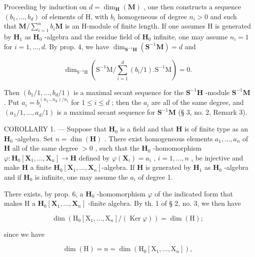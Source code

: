 Proceeding by induction on \(d = \dim_{\mathbf{H}}(\mathbf{M})\) , one then constructs a sequence \((b_1, \ldots, b_d)\) of elements of H, with \(b_i\) homogeneous of degree \(n_i > 0\) and such that \(\mathbf{M} / \sum_{i=1}^{n} b_i \mathbf{M}\) is an H-module of finite length. If one assumes H is generated by \(\mathbf{H}_1\) as \(\mathbf{H}_0\) -algebra and the residue field of \(\mathbf{H}_0\) infinite, one may assume \(n_i = 1\) for \(i = 1, \ldots, d\). By prop. 4, we have \(\dim_{\mathbf{S}^{-1}\mathbf{H}}(\mathbf{S}^{-1}\mathbf{M}) = d\) and

\[
\dim_ {\mathrm{S} ^ {- 1} \mathrm{H}} (\mathrm{S} ^ {- 1} \mathrm{M} / \sum_ {i = 1} ^ {d} (b _ {i} / 1). \mathrm{S} ^ {- 1} \mathrm{M}) = 0.
\]

Then \((b_{1} / 1,\dots,b_{d} / 1)\) is a maximal secant sequence for the \(\mathbf{S}^{-1}\mathbf{H}\) -module \(\mathbf{S}^{-1}\mathbf{M}\) . Put \(a_{i} = b_{i}^{(n_{1}\dots n_{d}) / n_{i}}\) for \(1\leqslant i\leqslant d\) ; then the \(a_{i}\) are all of the same degree, and \((a_{1} / 1,\dots,a_{d} / 1)\) is a maximal secant sequence for \(\mathbf{S}^{-1}\mathbf{M}\) (§ 3, no. 2, Remark 3).

COROLLARY 1. --- Suppose that \(\mathbf{H}_0\) is a field and that \(\mathbf{H}\) is of finite type as an \(\mathbf{H}_0\) -algebra. Set \(n = \dim(\mathbf{H})\) . There exist homogeneous elements \(a_1, ..., a_n\) of \(\mathbf{H}\) all of the same degree \(>0\) , such that the \(\mathbf{H}_0\) -homomorphism \(\varphi: \mathbf{H}_0[\mathbf{X}_1, ..., \mathbf{X}_n] \to \mathbf{H}\) defined by \(\varphi(\mathbf{X}_i) = a_i\) , \(i = 1, ..., n\) , be injective and make \(\mathbf{H}\) a finite \(\mathbf{H}_0[\mathbf{X}_1, ..., \mathbf{X}_n]\)-algebra. If \(\mathbf{H}\) is generated by \(\mathbf{H}_1\) as \(\mathbf{H}_0\) -algebra and if \(\mathbf{H}_0\) is infinite, one may assume the \(a_i\) of degree 1.

There exists, by prop. 6, a \(\mathbf{H}_0\) -homomorphism \(\varphi\) of the indicated form that makes H a \(\mathbf{H}_0[\mathbf{X}_1, \ldots, \mathbf{X}_n]\) -finite algebra. By th. 1 of § 2, no. 3, we then have

\[
\dim \left(\mathrm{H} _ {0} \left[ \mathrm{X} _ {1}, \dots , \mathrm{X} _ {n} \right] / (\operatorname{Ker} \varphi)\right) = \dim (\mathrm{H});
\]

since we have

\[
\dim (\mathrm{H}) = n = \dim \left(\mathrm{H} _ {0} \left[ \mathrm{X} _ {1}, \dots , \mathrm{X} _ {n} \right]\right),
\]

